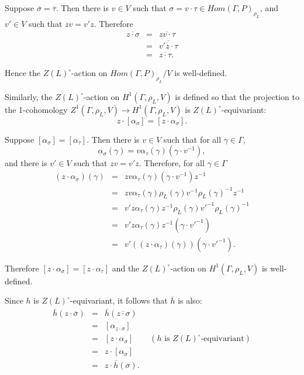 Suppose $\overline{\sigma} = \overline{\tau}$. Then there is $v \in V$ such that $\sigma = v \cdot \tau \in Hom(\Gamma, P)_{\rho_L}$, and $v' \in V$ such that $zv = v' z$. Therefore
\begin{eqnarray*}
  \overline{z \cdot \sigma} &=& \overline{zv \cdot \tau} \\
  &=& \overline{v' z \cdot \tau} \\
  &=& \overline{z \cdot \tau}.
\end{eqnarray*}

Hence the $Z(L)^\circ$-action on $Hom(\Gamma, P)_{\rho_L}/V$ is well-defined.

Similarly, the $Z(L)^\circ$-action on $H^1(\Gamma, \rho_L, V)$ is defined so that the projection to the 1-cohomology $Z^1(\Gamma, \rho_L, V) \rightarrow H^1(\Gamma, \rho_L, V)$ is $Z(L)^\circ$-equivariant:
\begin{displaymath}
  z \cdot [\alpha_\sigma] = [z \cdot \alpha_\sigma].
\end{displaymath}

Suppose $[\alpha_\sigma] = [\alpha_\tau]$. Then there is $v \in V$ such that for all $\gamma \in \Gamma$,
\begin{displaymath}
  \alpha_\sigma(\gamma) = v \alpha_\tau(\gamma) (\gamma \cdot v^{-1}),
\end{displaymath}
and there is $v' \in V$ such that $zv = v' z$. Therefore, for all $\gamma \in \Gamma$
\begin{eqnarray*}
	(z \cdot \alpha_\sigma)(\gamma) 
  &=& z v \alpha_\tau(\gamma) (\gamma \cdot v^{-1}) z^{-1} \\
  &=& z v \alpha_\tau(\gamma) \rho_L(\gamma) v^{-1} \rho_L(\gamma)^{-1} z^{-1} \\
  &=& v' z \alpha_\tau(\gamma) z^{-1} \rho_L(\gamma) v'^{-1} \rho_L(\gamma)^{-1} \\
  &=& v' z \alpha_\tau(\gamma) z^{-1} (\gamma \cdot v'^{-1}) \\
  &=& v' ((z \cdot \alpha_\tau)(\gamma)) (\gamma \cdot v'^{-1}).
\end{eqnarray*}

Therefore $[z \cdot \alpha_\sigma] = [z \cdot \alpha_\tau]$ and the $Z(L)^\circ$-action on $H^1(\Gamma, \rho_L, V)$ is well-defined.

Since $h$ is $Z(L)^\circ$-equivariant, it follows that $\overline{h}$ is also:
\begin{eqnarray*}
  \overline{h}(z \cdot \overline{\sigma}) &=& \overline{h}(\overline{z \cdot \sigma}) \\
  &=& [\alpha_{z \cdot \sigma}] \\
  &=& [z \cdot \alpha_\sigma] \qquad (h \textrm{ is } Z(L)^\circ \textrm{-equivariant}) \\
  &=& z \cdot [\alpha_\sigma] \\
  &=& z \cdot \overline{h}(\overline{\sigma}).
\end{eqnarray*}

